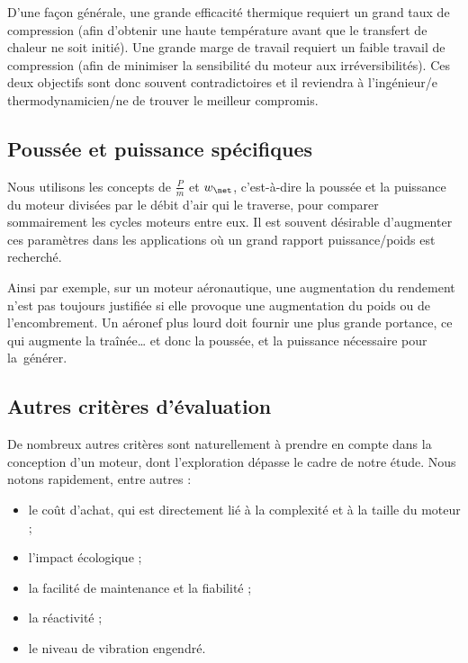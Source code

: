 		D’une façon générale, une grande efficacité thermique requiert un grand taux de compression (afin d’obtenir une haute température avant que le transfert de chaleur ne soit initié). Une grande marge de travail requiert un faible travail de compression (afin de minimiser la sensibilité du moteur aux irréversibilités). Ces deux objectifs sont donc souvent contradictoires et il reviendra à l’ingénieur/e thermodynamicien/ne de trouver le meilleur compromis.
		

	\subsection{Poussée et puissance spécifiques}
	\label{ch_poussee_puissance_specifiques}

		Nous utilisons les concepts de  $\frac{P}{\dot m}$ et  $w_\net$, c’est-à-dire la poussée et la puissance du moteur divisées par le débit d’air qui le traverse, pour comparer sommairement les cycles moteurs entre eux. Il est souvent désirable d’augmenter ces paramètres dans les applications où un grand rapport puissance/poids est recherché.

		Ainsi par exemple, sur un moteur aéronautique, une augmentation du rendement n’est pas toujours justifiée si elle provoque une augmentation du poids ou de l’encombrement. Un aéronef plus lourd doit fournir une plus grande portance, ce qui augmente la traînée… et donc la poussée, et la puissance nécessaire pour la~générer.

	
	\subsection{Autres critères d’évaluation}
	
		De nombreux autres critères sont naturellement à prendre en compte dans la conception d’un moteur, dont l’exploration dépasse le cadre de notre étude. Nous notons rapidement, entre autres :
		
		\begin{itemize}
			\item le coût d’achat, qui est directement lié à la complexité et à la taille du moteur ;
			\item l’impact écologique ;
			\item la facilité de maintenance et la fiabilité ;
			\item la réactivité ;
			\item le niveau de vibration engendré.
		\end{itemize}


